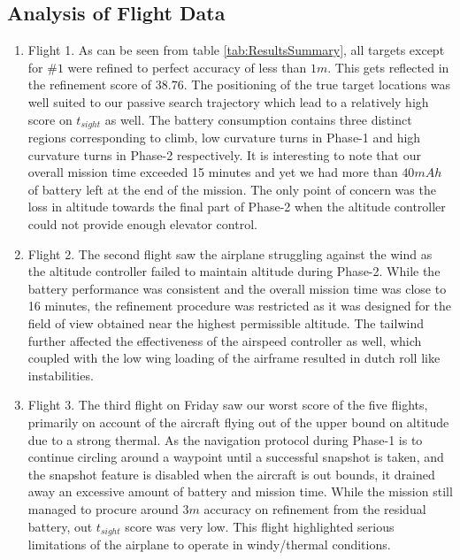 \documentclass[11pt]{article}
\begin{document}
	\subsection{Analysis of Flight Data}
	\label{AnalFltData}
\begin{enumerate}

\item Flight 1. As can be seen from table \ref{tab:ResultsSummary}, all targets except for $\#1$ were refined to perfect accuracy of less than $1m$. This gets reflected in the refinement score of $38.76$. The positioning of the true target locations was well suited to our passive search trajectory which lead to a relatively high score on $t_{sight}$ as well. The battery consumption contains three distinct regions corresponding to climb, low curvature turns in Phase-1 and high curvature turns in Phase-2 respectively. It is interesting to note that our overall mission time exceeded 15 minutes and yet we had more than $40 mAh$ of battery left at the end of the mission. The only point of concern was the loss in altitude towards the final part of Phase-2 when the altitude controller could not provide enough elevator control.

\item Flight 2. The second flight saw the airplane struggling against the wind as the altitude controller failed to maintain altitude during Phase-2. While the battery performance was consistent and the overall mission time was close to 16 minutes, the refinement procedure was restricted as it was designed for the field of view obtained near the highest permissible altitude. The tailwind further affected the effectiveness of the airspeed controller as well, which coupled with the low wing loading of the airframe resulted in dutch roll like instabilities.

\item Flight 3. The third flight on Friday saw our worst score of the five flights, primarily on account of the aircraft flying out of the upper bound on altitude due to a strong thermal. As the navigation protocol during Phase-1 is to continue circling around a waypoint until a successful snapshot is taken, and the snapshot feature is disabled when the aircraft is out bounds, it drained away an excessive amount of battery and mission time. While the mission still managed to procure around $3m$ accuracy on refinement from the residual battery, out $t_{sight}$ score was very low. This flight highlighted serious limitations of the airplane  to operate in windy/thermal conditions.


\end{enumerate}
\end{document}
